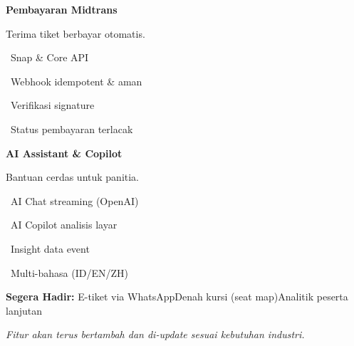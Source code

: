 \documentclass[a4paper]{article}
\begin{document}
\noindent
\begin{minipage}[t]{0.485\textwidth}
    \colorbox{OrangePrimary}{%
        \begin{minipage}{\dimexpr\textwidth-2\fboxsep\relax}
            {\fontsize{10}{13}\selectfont\bfseries\color{White} Pembayaran Midtrans}
        \end{minipage}}\par
    \vspace{4pt}
    {\fontsize{9}{12}\selectfont\color{TextDark}%
    Terima tiket berbayar otomatis.\par\vspace{3pt}
    \textbullet\ Snap \& Core API\par\vspace{2pt}%
    \textbullet\ Webhook idempotent \& aman\par\vspace{2pt}%
    \textbullet\ Verifikasi signature\par\vspace{2pt}%
    \textbullet\ Status pembayaran terlacak}%

\end{minipage}%
\hfill
\begin{minipage}[t]{0.485\textwidth}
    \colorbox{EmeraldDark}{%
        \begin{minipage}{\dimexpr\textwidth-2\fboxsep\relax}
            {\fontsize{10}{13}\selectfont\bfseries\color{White} AI Assistant \& Copilot}
        \end{minipage}}\par
    \vspace{4pt}
    {\fontsize{9}{12}\selectfont\color{TextDark}%
    Bantuan cerdas untuk panitia.\par\vspace{3pt}
    \textbullet\ AI Chat streaming (OpenAI)\par\vspace{2pt}%
    \textbullet\ AI Copilot analisis layar\par\vspace{2pt}%
    \textbullet\ Insight data event\par\vspace{2pt}%
    \textbullet\ Multi-bahasa (ID/EN/ZH)}%

\end{minipage}

\vspace{8pt}

{\setlength{\fboxsep}{8pt}\setlength{\fboxrule}{0pt}%
\noindent\colorbox{BlueBg}{%
    \begin{minipage}{\dimexpr\textwidth-2\fboxsep\relax}
        {\fontsize{9}{12}\selectfont\bfseries\color{BlueDark} Segera Hadir:}\enspace
        {\fontsize{9}{12}\selectfont\color{TextDark} E-tiket via WhatsApp\enspace\textcolor{BluePrimary}{\textbullet}\enspace Denah kursi (seat map)\enspace\textcolor{BluePrimary}{\textbullet}\enspace Analitik peserta lanjutan}\par\vspace{3pt}
        {\fontsize{8.5}{11}\selectfont\color{TextLight}\textit{Fitur akan terus bertambah dan di-update sesuai kebutuhan industri.}}
    \end{minipage}}}
\end{document}
